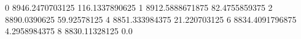 0 8946.2470703125 116.1337890625
1 8912.5888671875 82.4755859375
2 8890.0390625 59.92578125
4 8851.333984375 21.220703125
6 8834.4091796875 4.2958984375
8 8830.11328125 0.0
